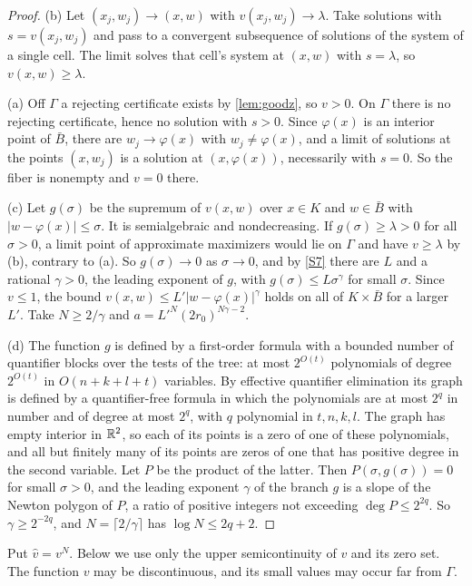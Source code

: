 \begin{proof}
(b) Let $(x_j,w_j)\to(x,w)$ with $v(x_j,w_j)\to\lambda$. Take solutions with $s=v(x_j,w_j)$ and pass to a convergent subsequence of solutions of the system of a single cell. The limit solves that cell's system at $(x,w)$ with $s=\lambda$, so $v(x,w)\ge\lambda$.

(a) Off $\Gamma$ a rejecting certificate exists by \cref{lem:goodz}, so $v>0$. On $\Gamma$ there is no rejecting certificate, hence no solution with $s>0$. Since $\varphi(x)$ is an interior point of $\bar B$, there are $w_j\to\varphi(x)$ with $w_j\ne\varphi(x)$, and a limit of solutions at the points $(x,w_j)$ is a solution at $(x,\varphi(x))$, necessarily with $s=0$. So the fiber is nonempty and $v=0$ there.

(c) Let $g(\sigma)$ be the supremum of $v(x,w)$ over $x\in K$ and $w\in\bar B$ with $|w-\varphi(x)|\le\sigma$. It is semialgebraic and nondecreasing. If $g(\sigma)\ge\lambda>0$ for all $\sigma>0$, a limit point of approximate maximizers would lie on $\Gamma$ and have $v\ge\lambda$ by (b), contrary to (a). So $g(\sigma)\to0$ as $\sigma\to0$, and by \ref{S7} there are $L$ and a rational $\gamma>0$, the leading exponent of $g$, with $g(\sigma)\le L\sigma^\gamma$ for small $\sigma$. Since $v\le1$, the bound $v(x,w)\le L'|w-\varphi(x)|^\gamma$ holds on all of $K\times\bar B$ for a larger $L'$. Take $N\ge2/\gamma$ and $a=L'^N(2r_0)^{N\gamma-2}$.

(d) The function $g$ is defined by a first-order formula with a bounded number of quantifier blocks over the tests of the tree: at most $2^{O(t)}$ polynomials of degree $2^{O(t)}$ in $O(n+k+l+t)$ variables. By effective quantifier elimination \cite[Chapter~14]{BPR06} its graph is defined by a quantifier-free formula in which the polynomials are at most $2^{q}$ in number and of degree at most $2^{q}$, with $q$ polynomial in $t,n,k,l$. The graph has empty interior in $\mathbb{R}^2$, so each of its points is a zero of one of these polynomials, and all but finitely many of its points are zeros of one that has positive degree in the second variable. Let $P$ be the product of the latter. Then $P(\sigma,g(\sigma))=0$ for small $\sigma>0$, and the leading exponent $\gamma$ of the branch $g$ is a slope of the Newton polygon of $P$, a ratio of positive integers not exceeding $\deg P\le2^{2q}$. So $\gamma\ge2^{-2q}$, and $N=\lceil2/\gamma\rceil$ has $\log N\le2q+2$.
\end{proof}

Put $\hat v=v^N$. Below we use only the upper semicontinuity of $v$ and its zero set. The function $v$ may be discontinuous, and its small values may occur far from $\Gamma$.

